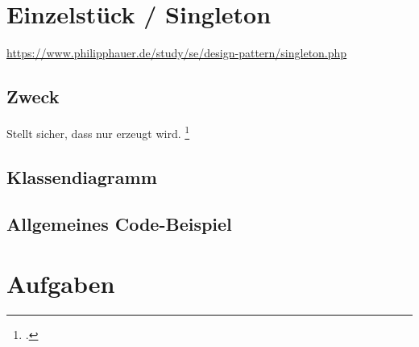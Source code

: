 \documentclass{lehramt-informatik}
\begin{document}

\chapter{Einzelstück / Singleton}

\begin{quellen}
\item \cite{wiki:singleton}
\item \url{https://www.philipphauer.de/study/se/design-pattern/singleton.php}
\item \cite[Seite 109-115]{gof}
\item \cite[Kapitel 8.3.1, Seite 247-249]{schatten}
\item \cite[Kapitel 3.4 Seite 38-43]{eilebrecht}
\item \cite[Kapitel 1, Seite 1-17]{siebler}
\end{quellen}

\section{Zweck}

Stellt sicher, dass nur  erzeugt
wird.
\footcite[Seite 38]{eilebrecht}

%

\section{Klassendiagramm}


%

\section{Allgemeines Code-Beispiel}



\chapter{Aufgaben}

\literatur
\end{document}
